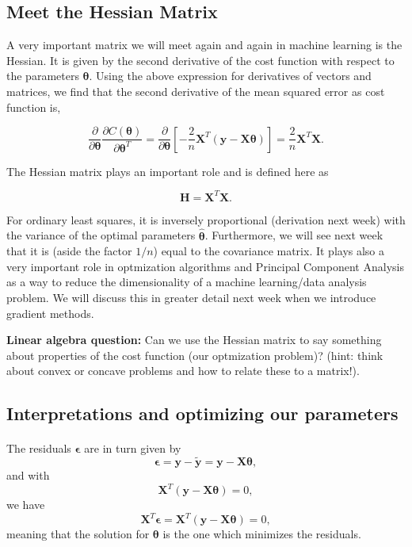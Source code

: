 \documentclass[%
oneside,                 %
final,                   %
10pt]{article}
\begin{document}
\subsection*{Meet the Hessian Matrix}

A very important matrix we will meet again and again in machine
learning is the Hessian.  It is given by the second derivative of the
cost function with respect to the parameters $\bm{\theta}$. Using the above
expression for derivatives of vectors and matrices, we find that the
second derivative of the mean squared error as cost function is,

\[
\frac{\partial}{\partial \bm{\theta}}\frac{\partial C(\bm{\theta})}{\partial \bm{\theta}^T} =\frac{\partial}{\partial \bm{\theta}}\left[-\frac{2}{n}\bm{X}^T\left( \bm{y}-\bm{X}\bm{\theta}\right)\right]=\frac{2}{n}\bm{X}^T\bm{X}.  
\]

The Hessian matrix plays an important role and is defined here as

\[
\bm{H}=\bm{X}^T\bm{X}.
\]

For ordinary least squares, it is inversely proportional (derivation
next week) with the variance of the optimal parameters
$\hat{\bm{\theta}}$. Furthermore, we will see next week that it is
(aside the factor $1/n$) equal to the covariance matrix. It plays also a very
important role in optmization algorithms and Principal Component
Analysis as a way to reduce the dimensionality of a machine learning/data analysis
problem. We will discuss this in greater detail next week when we introduce gradient methods.

\textbf{Linear algebra question:}  Can we use the Hessian matrix to say something about properties of the cost function (our optmization  problem)? (hint: think about convex or concave problems and how to relate these to a matrix!). 

\subsection*{Interpretations and optimizing our parameters}


\paragraph{}
The residuals $\bm{\epsilon}$ are in turn given by
\[
\bm{\epsilon} = \bm{y}-\bm{\tilde{y}} = \bm{y}-\bm{X}\bm{\theta},
\]
and with 
\[
\bm{X}^T\left( \bm{y}-\bm{X}\bm{\theta}\right)= 0, 
\]
we have
\[
\bm{X}^T\bm{\epsilon}=\bm{X}^T\left( \bm{y}-\bm{X}\bm{\theta}\right)= 0, 
\]
meaning that the solution for $\bm{\theta}$ is the one which minimizes the residuals.
\end{document}
